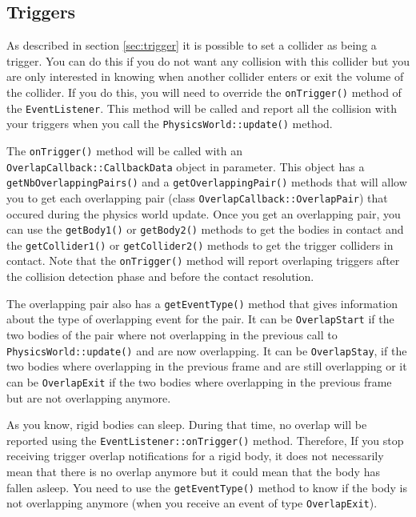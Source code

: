 \documentclass[a4paper,12pt]{article}
\begin{document}
    \subsection{Triggers}
    \label{sec:eventlistenertriggers}

    As described in section \ref{sec:trigger} it is possible to set a collider as being a trigger. You can do this if you do not want any collision with
    this collider but you are only interested in knowing when another collider enters or exit the volume of the collider. If you do this, you will need
    to override the \texttt{onTrigger()} method of the \texttt{EventListener}. This method will be called and report all the collision with your triggers
    when you call the \texttt{PhysicsWorld::update()} method. \\

    \begin{sloppypar}
    The \texttt{onTrigger()} method will be called with an \texttt{OverlapCallback::CallbackData} object in parameter. This object has a
    \texttt{getNbOverlappingPairs()} and a \texttt{getOverlappingPair()} methods that will allow you to get each overlapping pair (class
    \texttt{OverlapCallback::OverlapPair}) that occured during the physics world update. Once you get an overlapping pair, you can use
    the \texttt{getBody1()} or \texttt{getBody2()} methods to get the bodies in
    contact and the \texttt{getCollider1()} or \texttt{getCollider2()} methods to get the trigger colliders in contact.
    Note that the \texttt{onTrigger()} method will report overlaping triggers after the collision detection phase and before the contact resolution. \\
    \end{sloppypar}

    \begin{sloppypar}
    The overlapping pair also has a \texttt{getEventType()} method that gives information about the type of overlapping event for the pair. It can be
    \texttt{OverlapStart} if the two bodies of the pair where not overlapping in the previous call to \texttt{PhysicsWorld::update()} and are now
    overlapping. It can be \texttt{OverlapStay}, if the two bodies where overlapping in the previous frame and are still overlapping or it can be
    \texttt{OverlapExit} if the two bodies where overlapping in the previous frame but are not overlapping anymore. \\
    \end{sloppypar}

    \begin{sloppypar}
    As you know, rigid bodies can sleep. During that time, no overlap will be reported using the \texttt{EventListener::onTrigger()} method. Therefore,
    If you stop receiving trigger overlap notifications for a rigid body, it does not necessarily mean that there is no overlap anymore but it could mean
    that the body has fallen asleep. You need to use the \texttt{getEventType()} method to know if the body is not overlapping anymore (when you receive an
    event of type \texttt{OverlapExit}). \\
    \end{sloppypar}
\end{document}
